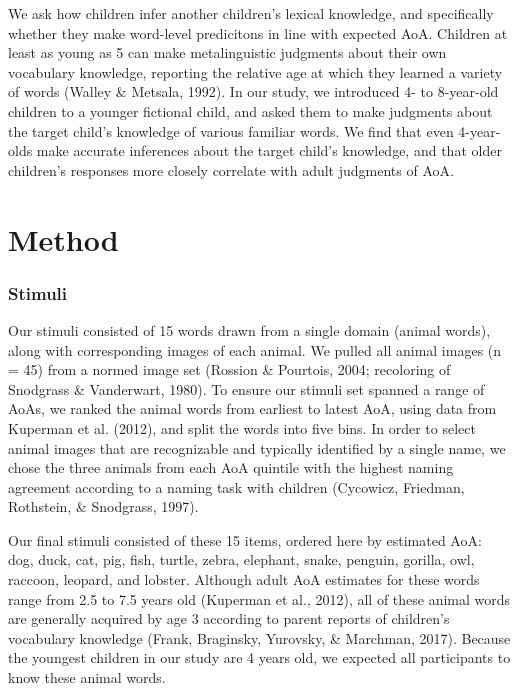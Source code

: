 \documentclass[10pt, letterpaper]{article}
\begin{document}
We ask how children infer another children's lexical knowledge, and
specifically whether they make word-level predicitons in line with
expected AoA. Children at least as young as 5 can make metalinguistic
judgments about their own vocabulary knowledge, reporting the relative
age at which they learned a variety of words (Walley \& Metsala, 1992).
In our study, we introduced 4- to 8-year-old children to a younger
fictional child, and asked them to make judgments about the target
child's knowledge of various familiar words. We find that even
4-year-olds make accurate inferences about the target child's knowledge,
and that older children's responses more closely correlate with adult
judgments of AoA.

\hypertarget{method}{%
\section{Method}\label{method}}

\hypertarget{stimuli}{%
\subsubsection{Stimuli}\label{stimuli}}

Our stimuli consisted of 15 words drawn from a single domain (animal
words), along with corresponding images of each animal. We pulled all
animal images (n = 45) from a normed image set (Rossion \& Pourtois,
2004; recoloring of Snodgrass \& Vanderwart, 1980). To ensure our
stimuli set spanned a range of AoAs, we ranked the animal words from
earliest to latest AoA, using data from Kuperman et al. (2012), and
split the words into five bins. In order to select animal images that
are recognizable and typically identified by a single name, we chose the
three animals from each AoA quintile with the highest naming agreement
according to a naming task with children (Cycowicz, Friedman, Rothstein,
\& Snodgrass, 1997).

Our final stimuli consisted of these 15 items, ordered here by estimated
AoA: dog, duck, cat, pig, fish, turtle, zebra, elephant, snake, penguin,
gorilla, owl, raccoon, leopard, and lobster. Although adult AoA
estimates for these words range from 2.5 to 7.5 years old (Kuperman et
al., 2012), all of these animal words are generally acquired by age 3
according to parent reports of children's vocabulary knowledge (Frank,
Braginsky, Yurovsky, \& Marchman, 2017). Because the youngest children
in our study are 4 years old, we expected all participants to know these
animal words.
\end{document}
